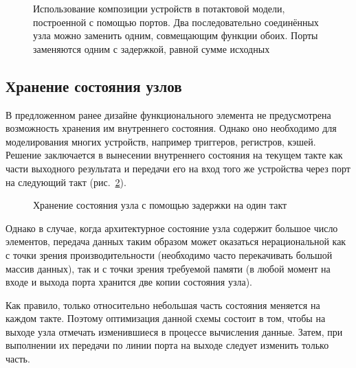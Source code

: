 \begin{figure}[htbp]
    \centering
    \caption[Использование композиции устройств в модели]{Использование композиции устройств в потактовой модели, построенной с помощью портов. Два последовательно соединённых узла можно заменить одним, совмещающим функции обоих. Порты заменяются одним с задержкой, равной сумме исходных}
    \label{fig:ports-compose}
\end{figure}


\subsection[Хранение состояния узлов]{Хранение состояния узлов}\label{sec:state}

В предложенном ранее дизайне функционального элемента не предусмотрена возможность хранения им внутреннего состояния. Однако оно необходимо для моделирования многих устройств, например триггеров, регистров, кэшей. Решение заключается в вынесении внутреннего состояния на текущем такте как части выходного результата и передачи его на вход того же устройства через порт на следующий такт (рис.~\ref{fig:state-storing}).

\begin{figure}[htbp]
    \centering
    \caption[Хранение состояния узла]{Хранение состояния узла с помощью задержки на один такт}
    \label{fig:state-storing}
\end{figure}

Однако в случае, когда архитектурное состояние узла содержит большое число элементов, передача данных таким образом может оказаться нерациональной как с точки зрения производительности (необходимо часто перекачивать большой массив данных), так и с точки зрения требуемой памяти (в любой момент на входе и выхода порта хранится две копии состояния узла). 

Как правило, только относительно небольшая часть состояния меняется на каждом такте. Поэтому оптимизация данной схемы состоит в том, чтобы на выходе узла отмечать изменившиеся в процессе вычисления данные. Затем, при выполнении их передачи по линии порта на выходе следует изменить только часть.



